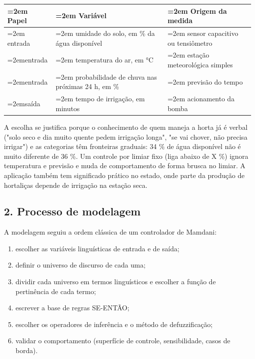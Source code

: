 \documentclass[12pt, a4paper]{article}
\providecommand{\tightlist}{%
  \setlength{\itemsep}{0pt}\setlength{\parskip}{0pt}}
\begin{document}
\begingroup
\setlength{\tabcolsep}{4.0pt}
\begin{longtable}{@{}>{\raggedright\hyphenpenalty=30\tolerance=999\emergencystretch=2em\arraybackslash}p{1.63cm}>{\raggedright\hyphenpenalty=30\tolerance=999\emergencystretch=2em\arraybackslash}p{7.76cm}>{\raggedright\hyphenpenalty=30\tolerance=999\emergencystretch=2em\arraybackslash}p{5.33cm}@{}}
\toprule\noalign{}
Papel & Variável & Origem da medida \\
\midrule\noalign{}
\endhead
\bottomrule\noalign{}
\endlastfoot
entrada & umidade do solo, em \% da água dis\-po\-ní\-vel & sensor capacitivo ou ten\-si\-ô\-me\-tro \\
entrada & temperatura do ar, em °C & estação me\-te\-o\-ro\-ló\-gica simples \\
entrada & probabilidade de chuva nas próximas 24 h, em \% & previsão do tempo \\
saída & tempo de irrigação, em minutos & acionamento da bomba \\
\end{longtable}
\endgroup

A escolha se justifica porque o conhecimento de quem maneja a horta já é verbal ("solo seco e dia muito quente pedem irrigação longa", "se vai chover, não precisa irrigar") e as categorias têm fronteiras graduais: 34 \% de água disponível não é muito diferente de 36 \%. Um controle por limiar fixo (liga abaixo de X \%) ignora temperatura e previsão e muda de comportamento de forma brusca no limiar. A aplicação também tem significado prático no estado, onde parte da produção de hortaliças depende de irrigação na estação seca.

\subsection{2. Processo de modelagem}\label{2-processo-de-modelagem}

A modelagem seguiu a ordem clássica de um controlador de Mamdani:

\begin{enumerate}
\def\labelenumi{\arabic{enumi}.}
\tightlist
\item
  escolher as variáveis linguísticas de entrada e de saída;
\item
  definir o universo de discurso de cada uma;
\item
  dividir cada universo em termos linguísticos e escolher a função de pertinência de cada termo;
\item
  escrever a base de regras SE-ENTÃO;
\item
  escolher os operadores de inferência e o método de defuzzificação;
\item
  validar o comportamento (superfície de controle, sensibilidade, casos de borda).
\end{enumerate}
\end{document}
